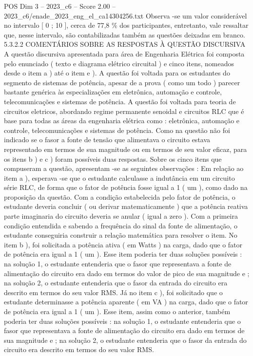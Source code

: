 \begin{textsample}{POS Dim 3 – 2023\_c6 – Score 2.00 – 2023\_c6/enade\_2023\_eng\_el\_ca14304256.txt}
Observa -se um valor considerável no intervalo [ 0 ; 10 ], cerca de 77,8 \% dos participantes, entretanto, vale ressaltar que, nesse intervalo, são contabilizadas também as questões deixadas em branco. 5.3.2.2 COMENTÁRIOS SOBRE AS RESPOSTAS À QUESTÃO DISCURSIVA A questão discursiva apresentada para área de Engenharia Elétrica foi composta pelo enunciado ( texto e diagrama elétrico circuital ) e cinco itens, nomeados desde o item a ) até o item e ).
A questão foi voltada para os estudantes do segmento de sistemas de potência, apesar de a prova ( como um todo ) parecer bastante genérica às especializações em eletrônica, automação e controle, telecomunicações e sistemas de potência.
A questão foi voltada para teoria de circuitos eletricos, abordando regime permanente senoidal e circuitos RLC que é base para todas as áreas da engenharia elétrica como : eletrônica, automação e controle, telecomunicações e sistemas de potência.
Como na questão não foi indicado se o fasor a fonte de tensão que alimentava o circuito estava representado em termos de sua magnitude ou em termos de seu valor eficaz, para os itens b ) e c ) foram possíveis duas respostas.
Sobre os cinco itens que compuseram a questão, apresentam -se as seguintes observações : Em relação ao item a ), esperava -se que o estudante calculasse a indutância em um circuito série RLC, de forma que o fator de potência fosse igual a 1 ( um ), como dado na proposição da questão.
Com a condição estabelecida pelo fator de potência, o estudante deveria concluir ( ou derivar matematicamente ) que a potência reativa parte imaginaria do circuito deveria se anular ( igual a zero ).
Com a primeira condição entendida e sabendo a frequência do sinal da fonte de alimentação, o estudante conseguiria construir a relação matemática para resolver o item.
No item b ), foi solicitada a potência ativa ( em Watts ) na carga, dado que o fator de potência era igual a 1 ( um ).
Esse item poderia ter duas soluções possíveis : na solução 1, o estudante entenderia que o fasor que representava a fonte de alimentação do circuito era dado em termos do valor de pico de sua magnitude e ; na solução 2, o estudante entenderia que o fasor da entrada do circuito era descrito em termos do seu valor RMS.
Já no item c ), foi solicitado que o estudante determinasse a potência aparente ( em VA ) na carga, dado que o fator de potência era igual a 1 ( um ).
Esse item, assim como o anterior, também poderia ter duas soluções possíveis : na solução 1, o estudante entenderia que o fasor que representava a fonte de alimentação do circuito era dado em termos de sua magnitude e ; na solução 2, o estudante entenderia que o fasor da entrada do circuito era descrito em termos do seu valor RMS.

\end{textsample}
